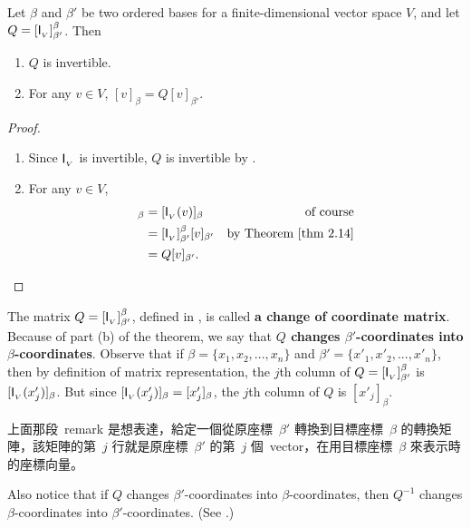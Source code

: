 \begin{theorem} \label{thm 2.22}
Let \(\beta\) and \(\beta'\) be two ordered bases for a finite-dimensional vector space \(V\), and let \(Q = [\textsf{I}_{_V}]_{\beta'}^{\beta}\).
Then
\begin{enumerate}
\item \(Q\) is invertible.
\item For any \(v \in V\), \([v]_{\beta} = Q[v]_{\beta'}\).
\end{enumerate}
\end{theorem}

\begin{proof} \ 

\begin{enumerate}
\item Since \(\textsf{I}_{_V}\) is invertible, \(Q\) is invertible by .

\item For any \(v \in V\),
\begin{align*}
    [v]_{\beta} & = [\ITRANV(v)]_{\beta} & \text{of course} \\
                & = [\ITRANV]_{\beta'}^{\beta} [v]_{\beta'} & \text{by \THM{2.14}} \\
                & = Q [v]_{\beta'}.
\end{align*}
\end{enumerate}
\end{proof}

\begin{remark} \label{remark 2.5.1}
The matrix \(Q = [\textsf{I}_{_V}]_{\beta'}^{\beta}\), defined in , is called \textbf{a change of coordinate matrix}.
Because of part (b) of the theorem, we say that \textbf{\(Q\) changes \(\beta'\)-coordinates into \(\beta\)-coordinates}.
Observe that if \(\beta = \{ x_1, x_2, ..., x_n \}\) and \(\beta' = \{ x'_1, x'_2, ..., x'_n \}\), then by definition of matrix representation, the \(j\)th column of \(Q = [\textsf{I}_{_V}]_{\beta'}^{\beta}\) is \([\textsf{I}_{_V}(x'_j)]_{\beta}\).
But since \([\textsf{I}_{_V}(x'_j)]_{\beta} = [x'_j]_{\beta}\), the \(j\)th column of \(Q\) is \([x'_j]_{\beta}\).
\end{remark}

\begin{note}
上面那段\ remark 是想表達，給定一個從原座標\ \(\beta'\) 轉換到目標座標\ \(\beta\) 的轉換矩陣，該矩陣的第\ \(j\) 行就是原座標\ \(\beta'\) 的第\ \(j\) 個\ vector，在用目標座標\ \(\beta\) 來表示時的座標向量。
\end{note}

Also notice that if \(Q\) changes \(\beta'\)-coordinates into \(\beta\)-coordinates, then \(Q^{-1}\) changes \(\beta\)-coordinates into \(\beta'\)-coordinates. (See .)

